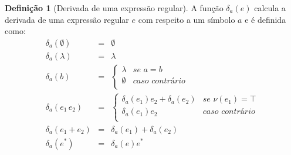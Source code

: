 \documentclass[a4paper]{article}
\theoremstyle{definition}
\newtheorem{Definition}{Definição}
\begin{document}
  \begin{Definition}[Derivada de uma expressão regular]
    A função $\delta_a(e)$ calcula a derivada de uma expressão regular $e$
    com respeito a um símbolo $a$ e é definida como:
    \[
      \begin{array}{lcl}
        \delta_a(\emptyset) & = & \emptyset \\
        \delta_a(\lambda)   & = & \lambda \\
        \delta_a(b)         & = & \left\{  \begin{array}{ll}
                                             \lambda   & \textit{se } a = b \\
                                             \emptyset & \textit{caso contrário}\\ 
                                           \end{array}\right. \\
        \delta_a(e_1\,e_2)  & = & \left\{  \begin{array}{ll}
                                             \delta_a(e_1)e_2 + \delta_a(e_2) &
                                                                                \textit{se
                                                                                }
                                                                                \nu(e_1)
                                                                                =
                                                                                \top
                                             \\
                                             \delta_a(e_1)e_2 & \textit{caso contrário}\\
                                           \end{array}\right. \\
        \delta_a(e_1 + e_2) & = & \delta_a(e_1) + \delta_a(e_2) \\
        \delta_a(e^*)  & = & \delta_a(e)e^*\\
      \end{array}
    \]
  \end{Definition}
\end{document}
